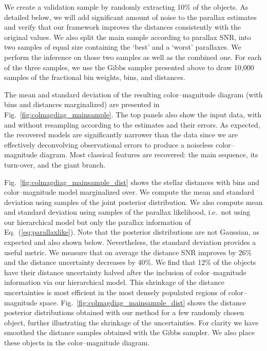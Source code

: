 \documentclass[manuscript, letterpaper]{aastex6}
\newcommand{\ie}{{{i.e.}~}}
\newcommand{\equref}[1]{{\xspace}Eq.~(\ref{#1})}
\newcommand{\figref}[1]{{\xspace}Fig.~\ref{#1}}
\begin{document}
We create a validation sample by randomly extracting 10\% of the objects. 
As detailed below, we will add significant amount of noise to the parallax estimates and verify that our framework improves the distances consistently with the original values. 
We also split the main sample according to parallax SNR, into two samples of equal size containing the `best' and a `worst' parallaxes. 
We perform the inference on those two samples as well as the combined one. 
For each of the three samples, we use the Gibbs sampler presented above to draw 10,000 samples of the fractional bin weights, bins, and distances. 

The mean and standard deviation of the resulting color--magnitude diagram (with bins and distances marginalized) are presented in \figref{fig:colmagdiag_mainsample}.
The top panels also show the input data, with and without resampling according to the estimates and their errors.
As expected, the recovered models are significantly narrower than the data since we are effectively deconvolving observational errors to produce a noiseless color--magnitude diagram. 
Most classical features are recovered: the main sequence, its turn-over, and the giant branch.

\figref{fig:colmagdiag_mainsample_dist} shows the stellar distances with bins and color--magnitude model marginalized over. 
We compute the mean and standard deviation using samples of the joint posterior distribution. 
We also compute mean and standard deviation using samples of the parallax likelihood, \ie not using our hierarchical model but only the parallax information of \equref{eq:parallaxlike}.
Note that the posterior distributions are not Gaussian, as expected and also shown below. 
Nevertheless, the standard deviation provides a useful metric. 
We measure that on average the distance SNR improves by 26\% and the distance uncertainty decreases by 40\%.
We find that 12\% of the objects have their distance uncertainty halved after the inclusion of color--magnitude information via our hierarchical model.
This shrinkage of the distance uncertainties is most efficient in the most densely populated regions of color--magnitude space.
\figref{fig:colmagdiag_mainsample_dist} shows the distance posterior distributions obtained with our method for a few randomly chosen object, further illustrating the shrinkage of the uncertainties.
For clarity we have smoothed the distance samples obtained with the Gibbs sampler.
We also place these objects in the color--magnitude diagram.
\end{document}

